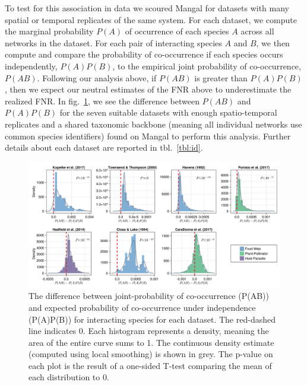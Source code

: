 \documentclass[10pt,oneside]{article}
\makeatletter
\def\maxwidth{\ifdim\Gin@nat@width>\linewidth\linewidth
\else\Gin@nat@width\fi}
\let\Oldincludegraphics\includegraphics
\renewcommand{\includegraphics}[1]{\Oldincludegraphics[width=\maxwidth]{#1}}
\makeatother
\begin{document}
To test for this association in data we scoured Mangal for datasets with
many spatial or temporal replicates of the same system. For each
dataset, we compute the marginal probability \(P(A)\) of occurrence of
each species \(A\) across all networks in the dataset. For each pair of
interacting species \(A\) and \(B\), we then compute and compare the
probability of co-occurrence if each species occurs independently,
\(P(A)P(B)\), to the empirical joint probability of co-occurrence,
\(P(AB)\). Following our analysis above, if \(P(AB)\) is greater than
\(P(A)P(B)\), then we expect our neutral estimates of the FNR above to
underestimate the realized FNR. In fig.~\ref{fig:mangal}, we see the
difference between \(P(AB)\) and \(P(A)P(B)\) for the seven suitable
datasets with enough spatio-temporal replicates and a shared taxonomic
backbone (meaning all individual networks use common species
identifiers) found on Mangal to perform this analysis. Further details
about each dataset are reported in tbl.~\ref{tbl:id}.

\begin{figure}
\hypertarget{fig:mangal}{%
\centering
\includegraphics{./figures/fig2.png}
\caption{The difference between joint-probability of co-occurrence
(P(AB)) and expected probability of co-occurrence under independence
(P(A)P(B)) for interacting species for each dataset. The red-dashed line
indicates 0. Each histogram represents a density, meaning the area of
the entire curve sums to 1. The continuous density estimate (computed
using local smoothing) is shown in grey. The p-value on each plot is the
result of a one-sided T-test comparing the mean of each distribution to
0.}\label{fig:mangal}
}
\end{figure}
\end{document}
